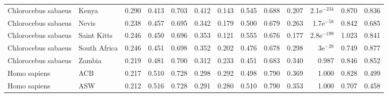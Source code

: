 \begin{longtable}{llrrrrrrrrrrr}
 Chlorocebus sabaeus &                     Kenya &                              0.290 &                               0.413 &                 0.703 &                 0.412 &                              0.143 &                               0.545 &                 0.688 &                 0.207 & 2.1e$^{-234}$ &  0.870 &  0.836 \\
 Chlorocebus sabaeus &                     Nevis &                              0.238 &                               0.457 &                 0.695 &                 0.342 &                              0.179 &                               0.500 &                 0.679 &                 0.263 &  1.7e$^{-58}$ &  0.842 &  0.685 \\
 Chlorocebus sabaeus &               Saint Kitts &                              0.246 &                               0.450 &                 0.696 &                 0.353 &                              0.121 &                               0.555 &                 0.676 &                 0.177 & 2.8e$^{-199}$ &  1.023 &  0.841 \\
 Chlorocebus sabaeus &              South Africa &                              0.246 &                               0.451 &                 0.698 &                 0.352 &                              0.202 &                               0.476 &                 0.678 &                 0.298 &    3e$^{-28}$ &  0.749 &  0.877 \\
 Chlorocebus sabaeus &                    Zambia &                              0.219 &                               0.481 &                 0.700 &                 0.312 &                              0.233 &                               0.451 &                 0.683 &                 0.340 &         0.987 &  0.846 &  0.852 \\
        Homo sapiens &                       ACB &                              0.217 &                               0.510 &                 0.728 &                 0.298 &                              0.292 &                               0.498 &                 0.790 &                 0.369 &         1.000 &  0.828 &  0.499 \\
        Homo sapiens &                       ASW &                              0.212 &                               0.516 &                 0.728 &                 0.291 &                              0.280 &                               0.510 &                 0.790 &                 0.353 &         1.000 &  0.707 &  0.458 \\

\end{longtable}
